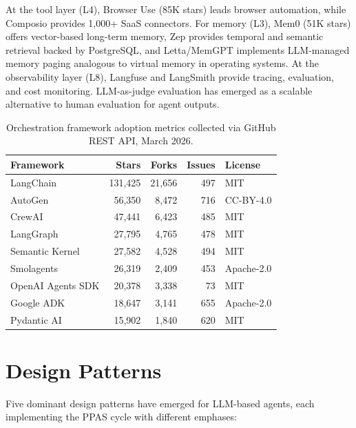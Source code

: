 \documentclass[review]{elsarticle}
\theoremstyle{definition}
\begin{document}
At the tool layer (L4), Browser Use (85K stars) leads browser automation, while Composio provides 1,000+ SaaS connectors. For memory (L3), Mem0 \citep{mem0_2024} (51K stars) offers vector-based long-term memory, Zep \citep{zep2024} provides temporal and semantic retrieval backed by PostgreSQL, and Letta/MemGPT \citep{packer2023memgpt} implements LLM-managed memory paging analogous to virtual memory in operating systems. At the observability layer (L8), Langfuse \citep{langfuse2024} and LangSmith \citep{langsmith2024} provide tracing, evaluation, and cost monitoring. LLM-as-judge evaluation \citep{zheng2024judging} has emerged as a scalable alternative to human evaluation for agent outputs.

\begin{table}[ht]
\centering
\caption{Orchestration framework adoption metrics collected via GitHub REST API, March 2026.}
\label{tab:frameworks}
\begin{tabular}{lrrrl}
\toprule
\textbf{Framework} & \textbf{Stars} & \textbf{Forks} & \textbf{Issues} & \textbf{License} \\
\midrule
LangChain        & 131,425 & 21,656 & 497  & MIT \\
AutoGen          & 56,350  & 8,472  & 716  & CC-BY-4.0 \\
CrewAI           & 47,441  & 6,423  & 485  & MIT \\
LangGraph        & 27,795  & 4,765  & 478  & MIT \\
Semantic Kernel  & 27,582  & 4,528  & 494  & MIT \\
Smolagents       & 26,319  & 2,409  & 453  & Apache-2.0 \\
OpenAI Agents SDK& 20,378  & 3,338  & 73   & MIT \\
Google ADK       & 18,647  & 3,141  & 655  & Apache-2.0 \\
Pydantic AI      & 15,902  & 1,840  & 620  & MIT \\
\bottomrule
\end{tabular}
\end{table}

\section{Design Patterns}\label{sec:patterns}

Five dominant design patterns have emerged for LLM-based agents, each implementing the PPAS cycle with different emphases:
\end{document}
